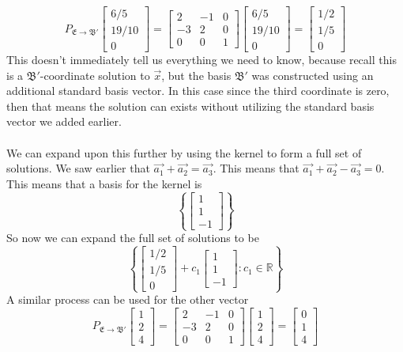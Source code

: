 \documentclass{report}
\begin{document}
$$
P_{\mathfrak{E}\rightarrow\mathfrak{B}'}\begin{bmatrix}6/5\\19/10\\0\end{bmatrix} =
\begin{bmatrix}
2&-1&0\\
-3&2&0\\
0&0&1
\end{bmatrix}\begin{bmatrix}6/5\\19/10\\0\end{bmatrix} =
\begin{bmatrix}1/2\\1/5\\0\end{bmatrix}
$$
This doesn't immediately tell us everything we need to know,  because recall this is a $\mathfrak{B}'$-coordinate solution to $\vec{x}$,  but the basis $\mathfrak{B}'$ was constructed using an additional standard basis vector.  In this case since the third coordinate is zero,  then that means the solution can exists without utilizing the standard basis vector we added earlier.  \\
\\
\noindent We can expand upon this further by using the kernel to form a full set of solutions.  We saw earlier that $\vec{a_1}+\vec{a_2}=\vec{a_3}$.  This means that $\vec{a_1}+\vec{a_2}-\vec{a_3} = 0$.  This means that a basis for the kernel is
$$
\left\{\begin{bmatrix}1\\1\\-1\end{bmatrix}\right\}
$$
So now we can expand the full set of solutions to be
$$
\left\{
\begin{bmatrix}1/2\\1/5\\0\end{bmatrix} + c_1\begin{bmatrix}1\\1\\-1\end{bmatrix} : c_1\in\mathbb{R}
\right\}
$$
A similar process can be used for the other vector
$$
P_{\mathfrak{E}\rightarrow\mathfrak{B}'}\begin{bmatrix}1\\2\\4\end{bmatrix} =
\begin{bmatrix}
2&-1&0\\
-3&2&0\\
0&0&1
\end{bmatrix}\begin{bmatrix}1\\2\\4\end{bmatrix} =
\begin{bmatrix}0\\1\\4\end{bmatrix}
$$
\end{document}
